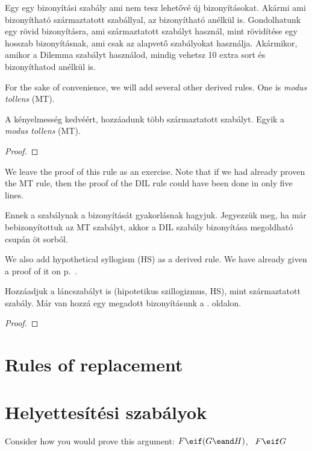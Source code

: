 Egy  egy bizonyítási szabály ami nem tesz lehetővé új bizonyításokat. Akármi ami bizonyítható származtatott szabállyal, az bizonyítható anélkül is. Gondolhatunk egy rövid bizonyításra, ami származtatott szabályt használ, mint rövidítése egy hosszab bizonyításnak, ami csak az alapvető szabályokat használja. Akármikor, amikor a Dilemma szabályt használod, mindig vehetsz 10 extra sort és bizonyíthatod anélkül is.

For the sake of convenience, we will add several other derived rules. One is \emph{modus tollens} (MT).

A kényelmesség kedvéért, hozzáadunk több származtatott szabályt. Egyik a \emph{modus tollens} (MT).

\begin{proof}
	 
\end{proof}

We leave the proof of this rule as an exercise. Note that if we had already proven the MT rule, then the proof of the DIL rule could have been done in only five lines.

Ennek a szabálynak a bizonyítását gyakorlásnak hagyjuk. Jegyezzük meg, ha már bebizonyítottuk az MT szabályt, akkor a DIL szabály bizonyítása megoldható csupán öt sorból.

We also add hypothetical syllogism (HS) as a derived rule. We have already given a proof of it on p.~\pageref{HSproof}.

Hozzáadjuk a láncszabályt is (hipotetikus szillogizmus, HS), mint származtatott szabály. Már van hozzá egy megadott bizonyításunk a \pageref{HSproof}. oldalon.

\begin{proof}
\end{proof}


\section*{Rules of replacement}
\section{Helyettesítési szabályok}
Consider how you would prove this argument: $F\eif(G\eand H)$, \therefore\ $F\eif G$

